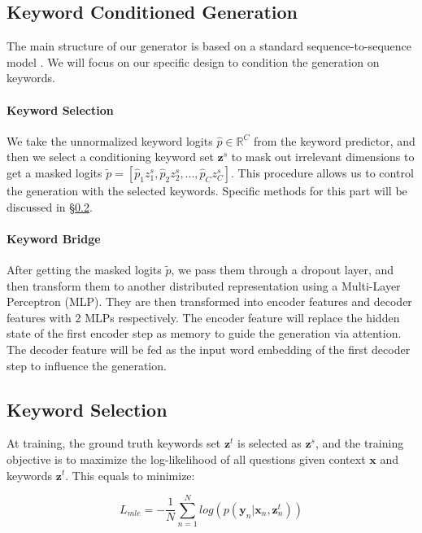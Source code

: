 \subsection{Keyword Conditioned Generation}
\label{sec:cond_gen}

The main structure of our generator is based on a standard sequence-to-sequence model \citep{luong2015effective}. We will focus on our specific design to condition the generation on keywords. 

\paragraph{Keyword Selection} We take the unnormalized keyword logits $\hat{p} \in \mathbb{R}^C$ from the keyword predictor, and then we select a conditioning keyword set $\mathbf{z}^s$ to mask out irrelevant dimensions to get a masked logits $\tilde{p} = [\hat{p}_1 z^s_1, \hat{p}_2 z^s_2, ..., \hat{p}_C z^s_C]$. This procedure allows us to control the generation with the selected keywords. Specific methods for this part will be discussed in \S \ref{sec:selection}.

\paragraph{Keyword Bridge} After getting the masked logits $\tilde{p}$, we pass them through a dropout layer, and then transform them to another distributed representation using a Multi-Layer Perceptron (MLP). They are then transformed into encoder features and decoder features with 2 MLPs respectively. The encoder feature will replace the hidden state of the first encoder step as memory to guide the generation via attention. The decoder feature will be fed as the input word embedding of the first decoder step to influence the generation.

\subsection{Keyword Selection}
\label{sec:selection}

At training, the ground truth keywords set $\mathbf{z}^t$ is selected as $\mathbf{z}^s$, and the training objective is to maximize the log-likelihood of all questions given context $\mathbf{x}$ and keywords $\mathbf{z}^t$. This equals to minimize: 

\begin{equation}
  L_{mle} = -\frac{1}{N}\sum^N_{n=1}log(p(\mathbf{y}_n|\mathbf{x}_n,\mathbf{z}^t_n))
  \label{equ:mle}
\end{equation}

